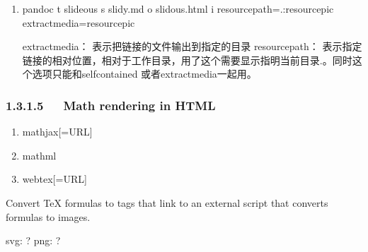 \documentclass[letterpaper,12pt,english]{sphinxmanual}
\begin{document}
\begin{enumerate}
\begin{itemize}
\begin{sphinxVerbatim}[commandchars=\\\{\}]

 

  
   
\end{sphinxVerbatim}

\end{itemize}

\item {} 

\begin{sphinxVerbatim}[commandchars=\\\{\}]
pandoc \PYGZhy{}t slideous \PYGZhy{}s slidy.md \PYGZhy{}o slidous.html \PYGZhy{}i \PYGZhy{}\PYGZhy{}resource\PYGZhy{}path=.:resource\PYGZbs{}pic \PYGZhy{}\PYGZhy{}extract\PYGZhy{}media=resource\PYGZbs{}pic

\PYGZhy{}\PYGZhy{}extract\PYGZhy{}media： 表示把链接的文件输出到指定的目录
\PYGZhy{}\PYGZhy{}resource\PYGZhy{}path： 表示指定链接的相对位置，相对于工作目录，用了这个需要显示指明当前目录.。同时这个选项只能和\PYGZhy{}\PYGZhy{}self\PYGZhy{}contained 或者\PYGZhy{}\PYGZhy{}extract\PYGZhy{}media一起用。
\end{sphinxVerbatim}

\end{enumerate}


\subsubsection{1.3.1.5   Math rendering in HTML}
\label{\detokenize{001software/001install/pandoc:math-rendering-in-html}}\begin{enumerate}
%
\item {} 
\textendash{}mathjax{[}=URL{]}

\item {} 
\textendash{}mathml

\item {} 
\textendash{}webtex{[}=URL{]}

\end{enumerate}

Convert TeX formulas to tags that link to an external script that
converts formulas to images.

svg: ? png:
?
\end{document}
